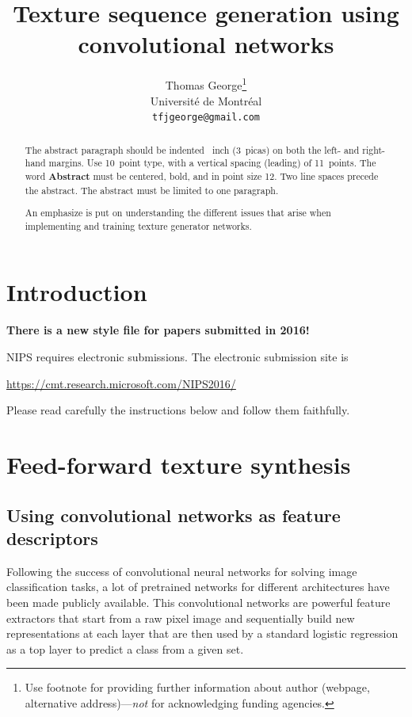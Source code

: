 \documentclass{article}
\title{Texture sequence generation using convolutional networks}
\author{
  Thomas George\thanks{Use footnote for providing further
    information about author (webpage, alternative
    address)---\emph{not} for acknowledging funding agencies.} \\
  Université de Montréal\\
  \texttt{tfjgeorge@gmail.com} \\
}
\begin{document}

\maketitle

\begin{abstract}
  The abstract paragraph should be indented ~inch
  (3~picas) on both the left- and right-hand margins. Use 10~point
  type, with a vertical spacing (leading) of 11~points.  The word
  \textbf{Abstract} must be centered, bold, and in point size 12. Two
  line spaces precede the abstract. The abstract must be limited to
  one paragraph.
  
  An emphasize is put on understanding the different issues that arise when implementing and training texture generator networks.
\end{abstract}

\section{Introduction}

\textbf{There is a new style file for papers submitted in 2016!}

NIPS requires electronic submissions.  The electronic submission site
is
\begin{center}
  \url{https://cmt.research.microsoft.com/NIPS2016/}
\end{center}

Please read carefully the instructions below and follow them
faithfully.

\section{Feed-forward texture synthesis}

\subsection{Using convolutional networks as feature descriptors}

Following the success of convolutional neural networks for solving image classification tasks, a lot of pretrained networks for different architectures have been made publicly available. This convolutional networks are powerful feature extractors that start from a raw pixel image and sequentially build new representations at each layer that are then used by a standard logistic regression as a top layer to predict a class from a given set.
\end{document}
